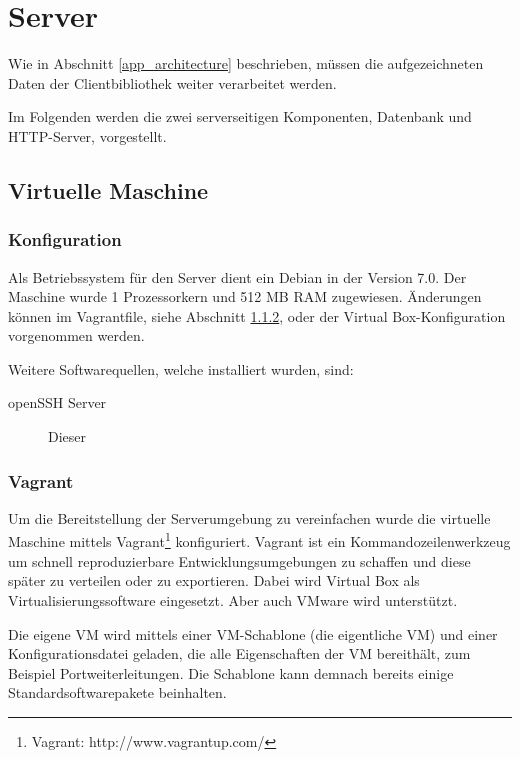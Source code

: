\section{Server}
\label{server}
Wie in Abschnitt \ref{app_architecture} beschrieben, müssen die aufgezeichneten Daten der Clientbibliothek weiter verarbeitet werden. %

Im Folgenden werden die zwei serverseitigen Komponenten, Datenbank und HTTP-Server, vorgestellt. 


\subsection{Virtuelle Maschine}

\subsubsection{Konfiguration}

Als Betriebssystem für den Server dient ein Debian in der Version 7.0. Der Maschine wurde 1 Prozessorkern und 512 MB RAM zugewiesen. Änderungen können im Vagrantfile, siehe Abschnitt \ref{vagrant}, oder der Virtual Box-Konfiguration vorgenommen werden.

Weitere Softwarequellen, welche installiert wurden, sind: 
\begin{description}
	\item[openSSH Server] 
	Dieser 
\end{description}

\subsubsection{Vagrant}
\label{vagrant}
Um die Bereitstellung der Serverumgebung zu vereinfachen wurde die virtuelle Maschine mittels Vagrant\footnote{Vagrant: http://www.vagrantup.com/} konfiguriert. Vagrant ist ein Kommandozeilenwerkzeug um schnell reproduzierbare Entwicklungsumgebungen zu schaffen und diese später zu verteilen oder zu exportieren. Dabei wird Virtual Box als Virtualisierungssoftware eingesetzt. Aber auch VMware wird unterstützt. 

Die eigene VM wird mittels einer VM-Schablone (die eigentliche VM) und einer Konfigurationsdatei geladen, die alle Eigenschaften der VM bereithält, zum Beispiel Portweiterleitungen. Die Schablone kann demnach bereits einige Standardsoftwarepakete beinhalten. 

